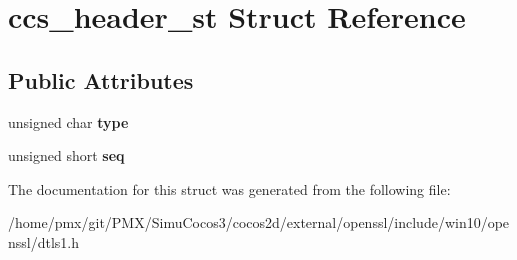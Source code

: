 \hypertarget{structccs__header__st}{}\section{ccs\+\_\+header\+\_\+st Struct Reference}
\label{structccs__header__st}
\subsection*{Public Attributes}
\begin{DoxyCompactItemize}
\item 
\mbox{\label{structccs__header__st_a9dc6e844d9a62957f26d52d475a1f7cb}} 
unsigned char {\bfseries type}
\item 
\mbox{\label{structccs__header__st_a08082f09ae8c97f2e5096ec64ba20cb3}} 
unsigned short {\bfseries seq}
\end{DoxyCompactItemize}


The documentation for this struct was generated from the following file\+:\begin{DoxyCompactItemize}
\item 
/home/pmx/git/\+P\+M\+X/\+Simu\+Cocos3/cocos2d/external/openssl/include/win10/openssl/dtls1.\+h\end{DoxyCompactItemize}
